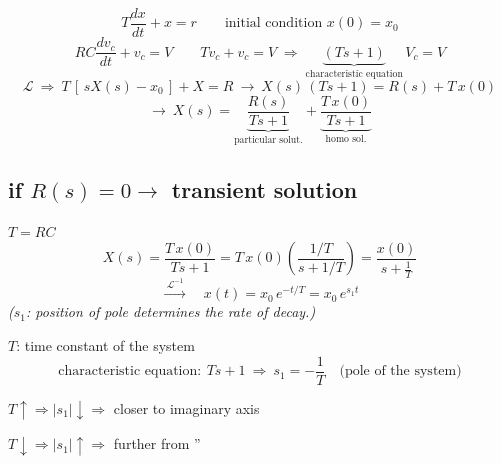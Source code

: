 \documentclass[11pt,a4paper]{article}
\begin{document}
\[ T\frac{dx}{dt}+x=r \qquad \text{initial condition } x(0)=x_0 \]
\[ RC\frac{dv_c}{dt}+v_c=V \qquad T\dot{v}_c+v_c=V \;\Rightarrow\; \underbrace{(Ts+1)}_{\text{characteristic equation}}\,V_c=V \]
\[ \mathcal{L}\ \Rightarrow\ T\,[\,sX(s)-x_0\,]+X=R \ \to\ X(s)\,(Ts+1)=R(s)+T\,x(0) \]
\[ \to\ X(s)=\underbrace{\frac{R(s)}{Ts+1}}_{\text{particular solut.}}+\underbrace{\frac{T\,x(0)}{Ts+1}}_{\text{homo sol.}} \]

\subsection{if $R(s)=0 \to$ transient solution}
$T=RC$
\[ X(s)=\frac{T\,x(0)}{Ts+1}=T\,x(0)\left(\frac{1/T}{s+1/T}\right)=\frac{x(0)}{s+\frac{1}{T}} \]
\[ \xrightarrow{\ \mathcal{L}^{-1}\ }\quad x(t)=x_0\,e^{-t/T}=x_0\,e^{s_1 t} \]
\textit{($s_1$: position of pole determines the rate of decay.)}
\begin{center}
\end{center}
$T$: time constant of the system
\[ \text{characteristic equation}:\ Ts+1\ \Rightarrow\ s_1=-\frac{1}{T}\quad\text{(pole of the system)} \]
\begin{center}
\end{center}
$T\uparrow \Rightarrow |s_1|\downarrow \Rightarrow$ closer to imaginary axis

$T\downarrow \Rightarrow |s_1|\uparrow \Rightarrow$ further from ''
\end{document}
